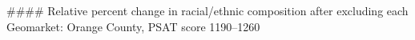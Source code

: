 #### Relative percent change in racial/ethnic composition after excluding each Geomarket: Orange County, PSAT score 1190–1260
